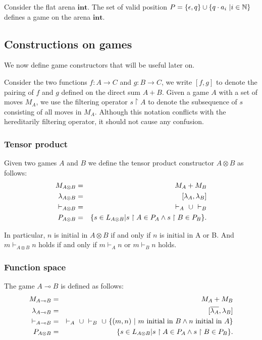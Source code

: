 \begin{exmp}  Consider the flat arena  $\mathbf{int}$.
The set of valid position $P = \{ \epsilon, q \} \cup \{ q \cdot
a_i \ | i \in \mathbb{N} \}$ defines a game on the arena $\mathbf{int}$.
\end{exmp}

\subsection{Constructions on games}
\label{sec:gameconstruction}

We now define game constructors that will be useful later on.

Consider the two functions $f : A \rightarrow C$ and $g : B
\rightarrow C$, we write $[f,g]$ to denote the pairing of $f$ and
$g$ defined on the direct sum $A + B$. Given a game $A$ with a set
of moves $M_A$, we use the filtering operator $s \upharpoonright A$
to denote the subsequence of $s$ consisting of all moves in $M_A$.
Although this notation conflicts with the hereditarily filtering
operator, it should not cause any confusion.

\subsubsection{Tensor product}
Given two games $A$ and $B$ we define the tensor product constructor
$A \otimes B$ as follows:
\begin{eqnarray*}
  M_{A \otimes B} &=& M_A + M_B \\
  \lambda_{A\otimes B} &=& [\lambda_A,\lambda_B] \\
  \vdash_{A\otimes B} & = & \vdash_{A}\ \cup\ \vdash_{B} \\
  P_{A\otimes B} & = & \{ s \in L_{A\otimes B} | s \upharpoonright A \in P_A \wedge s \upharpoonright B \in P_B  \}.
\end{eqnarray*}

In particular,  $n$ is initial in $A\otimes B$ if and only if $n$ is
initial in A or B. And $m \vdash_{A\otimes B} n$  holds if and only if $m
\vdash_{A} n$ or $m \vdash_{B} n$ holds.

\subsubsection{Function space}
The game $A \multimap B$ is defined as follows:
\begin{eqnarray*}
  M_{A \multimap B} &=& M_A + M_B \\
  \lambda_{A\multimap B} &=& [\overline{\lambda_A},\lambda_B] \\
  \vdash_{A\multimap B} & = & \vdash_{A}\ \union\ \vdash_{B}\ \union\  \{ (m,n) \ |\ m \mbox{ initial in } B \wedge n \mbox{ initial in } A \} \\
  P_{A\otimes B} & = & \{ s \in L_{A\otimes B} | s \upharpoonright A \in P_A \wedge s \upharpoonright B \in P_B  \}.
\end{eqnarray*}

